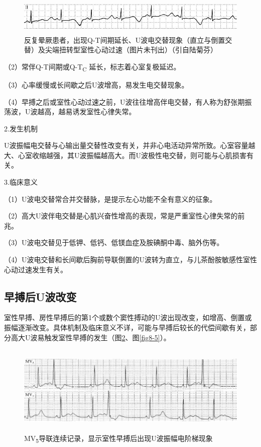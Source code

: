 \begin{figure}[!htbp]
 \centering
 \includegraphics[width=5.57292in,height=0.66667in]{./images/Image00122.jpg}
 \captionsetup{justification=centering}
 \caption{反复晕厥患者，出现Q-T间期延长、U波电交替现象（直立与倒置交替）及尖端扭转型室性心动过速（图片未刊出）（引自陆菊芬）}
 \label{fig8-3}
  \end{figure} 

（2）常伴Q-T间期或Q-T\textsubscript{C} 延长，标志着心室复极延迟。

（3）心率缓慢或长间歇之后U波增高，易发生电交替现象。

（4）早搏之后或室性心动过速之前，U波往往增高伴电交替，有人称为舒张期振荡波，U波越高，越易诱发室性心律失常。

2.发生机制

U波振幅电交替与心输出量交替性改变有关，并非心电活动异常所致。心室容量越大、心室收缩越强，其U波振幅越高大。而U波极性电交替，则可能与心肌损害有关。

3.临床意义

（1）U波电交替常合并交替脉，是提示左心功能不全有意义的征象。

（2）高大U波伴电交替是心肌兴奋性增高的表现，常是严重室性心律失常的前兆。

（3）U波电交替见于低钾、低钙、低镁血症及胺碘酮中毒、脑外伤等。

（4）U波电交替和长间歇后胸前导联倒置的U波转为直立，与儿茶酚胺敏感性室性心动过速发生有关。

\protect\hypertarget{text00014.htmlux5cux23subid114}{}{}

\subsection{早搏后U波改变}

室性早搏、房性早搏后的第1个或数个窦性搏动的U波出现改变，如增高、倒置或振幅逐渐改变。具体机制及临床意义不详，可能与早搏后较长的代偿间歇有关，部分高大U波易触发室性早搏的发生（图\ref{fig8-4}、图\ref{fig8-5}）。

\begin{figure}[!htbp]
 \centering
 \includegraphics[width=5.78125in,height=1.6875in]{./images/Image00123.jpg}
 \captionsetup{justification=centering}
 \caption{MV\textsubscript{5}导联连续记录，显示室性早搏后出现U波振幅电阶梯现象}
 \label{fig8-4}
  \end{figure} 


